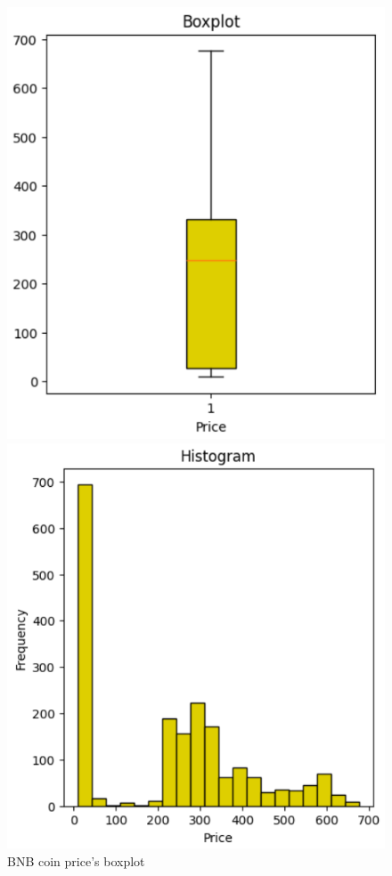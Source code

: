 \documentclass{ieeeojies}
\begin{document}
\begin{figure}[H]
  \centering
  \begin{minipage}{0.23\textwidth}
    \centering
    \includegraphics[width=1\textwidth]{Image/Discriptive/boxplot_bnb_new.png}
    \caption{BNB coin price's boxplot}
    \label{fig:1}
  \end{minipage}
  \hfill
  \begin{minipage}{0.23\textwidth}
    \centering
    \includegraphics[width=1\textwidth]{Image/Discriptive/histo_bnb_new.png}

\end{minipage}
\end{figure}
\end{document}
